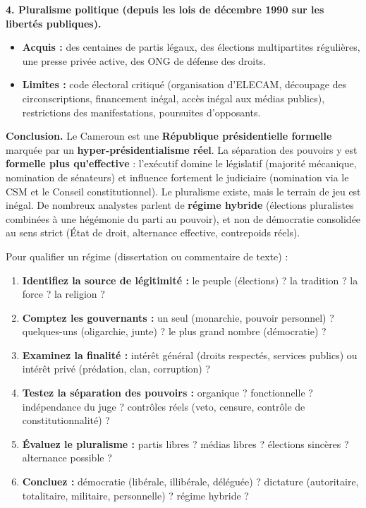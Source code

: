 \documentclass[11pt]{article}
\begin{document}
\begin{exoresolu}
\textbf{4. Pluralisme politique (depuis les lois de décembre 1990 sur les libertés publiques).}
\begin{itemize}
\item \textbf{Acquis :} des centaines de partis légaux, des élections multipartites régulières, une presse privée active, des ONG de défense des droits.
\item \textbf{Limites :} code électoral critiqué (organisation d'ELECAM, découpage des circonscriptions, financement inégal, accès inégal aux médias publics), restrictions des manifestations, poursuites d'opposants.
\end{itemize}

\textbf{Conclusion.} Le Cameroun est une \textbf{République présidentielle formelle} marquée par un \textbf{hyper-présidentialisme réel}. La séparation des pouvoirs y est \textbf{formelle plus qu'effective} : l'exécutif domine le législatif (majorité mécanique, nomination de sénateurs) et influence fortement le judiciaire (nomination via le CSM et le Conseil constitutionnel). Le pluralisme existe, mais le terrain de jeu est inégal. De nombreux analystes parlent de \textbf{régime hybride} (élections pluralistes combinées à une hégémonie du parti au pouvoir), et non de démocratie consolidée au sens strict (État de droit, alternance effective, contrepoids réels).
\end{exoresolu}

\begin{methode}
Pour qualifier un régime (dissertation ou commentaire de texte) :
\begin{enumerate}
\item \textbf{Identifiez la source de légitimité :} le peuple (élections) ? la tradition ? la force ? la religion ?
\item \textbf{Comptez les gouvernants :} un seul (monarchie, pouvoir personnel) ? quelques-uns (oligarchie, junte) ? le plus grand nombre (démocratie) ?
\item \textbf{Examinez la finalité :} intérêt général (droits respectés, services publics) ou intérêt privé (prédation, clan, corruption) ?
\item \textbf{Testez la séparation des pouvoirs :} organique ? fonctionnelle ? indépendance du juge ? contrôles réels (veto, censure, contrôle de constitutionnalité) ?
\item \textbf{Évaluez le pluralisme :} partis libres ? médias libres ? élections sincères ? alternance possible ?
\item \textbf{Concluez :} démocratie (libérale, illibérale, déléguée) ? dictature (autoritaire, totalitaire, militaire, personnelle) ? régime hybride ?
\end{enumerate}
\end{methode}
\end{document}
